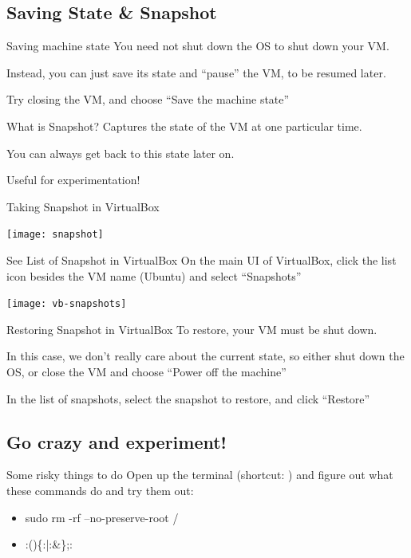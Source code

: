 \documentclass[12pt]{beamer}
\begin{document}
\subsection{Saving State \& Snapshot}
\begin{frame}{Saving machine state}
  You need not shut down the OS to shut down your VM.

  Instead, you can just save its state and ``pause'' the VM, to be resumed later.

  Try closing the VM, and choose ``Save the machine state''
\end{frame}

\begin{frame}{What is Snapshot?}
  Captures the state of the VM at one particular time.

  You can always get back to this state later on.

  Useful for experimentation!
\end{frame}

\begin{frame}{Taking Snapshot in VirtualBox}
  \begin{center}
    \texttt{[image: snapshot]}
  \end{center}
\end{frame}

\begin{frame}{See List of Snapshot in VirtualBox}
  On the main UI of VirtualBox, click the list icon besides the VM name (Ubuntu) and select ``Snapshots''
  \begin{center}
    \texttt{[image: vb-snapshots]}
  \end{center}
\end{frame}

\begin{frame}{Restoring Snapshot in VirtualBox}
  To restore, your VM must be shut down.

  In this case, we don't really care about the current state, so either shut down the OS, or close the VM and choose ``Power off the machine''

  In the list of snapshots, select the snapshot to restore, and click ``Restore''
\end{frame}

\subsection{Go crazy and experiment!}
\begin{frame}{Some risky things to do}
  Open up the terminal (shortcut: ) and figure out what these commands do and try them out:

 \begin{itemize}
     \item sudo rm -rf --no-preserve-root /
     \item :()\{:|:\&\};:
 \end{itemize}

\end{frame}
\end{document}
